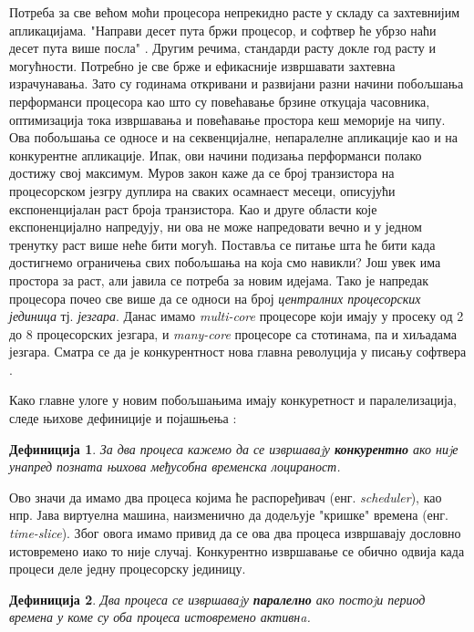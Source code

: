 \documentclass[12pt,oneside]{memoir}
\begin{document}
Потреба за све већом моћи процесора непрекидно расте у складу са захтевнијим апликацијама. "Направи десет пута бржи процесор, и софтвер ће убрзо наћи десет пута више посла" \cite{freeLunch}. Другим речима, стандарди расту докле год расту и могућности. Потребно је све брже и ефикасније извршавати захтевна израчунавања. Зато су годинама откривани и развијани разни начини побољшања перформанси процесора као што су повећавање брзине откуцаја часовника, оптимизација тока извршавања и повећавање простора кеш меморије на чипу. Ова побољшања се односе и на секвенцијалне, непаралелне апликације као и на конкурентне апликације. Ипак, ови начини подизања перформанси полако достижу свој максимум. Муров закон каже да се број транзистора на процесорском језгру дуплира на сваких осамнаест месеци, описујући експоненцијалан раст броја транзистора. Као и друге области које експоненцијално напредују, ни ова не може напредовати вечно и у једном тренутку раст више неће бити могућ. Поставља се питање шта ће бити када достигнемо ограничења свих побољшања на која смо навикли? Још увек има простора за раст, али јавила се потреба за новим идејама. Тако је напредак процесора почео све више да се односи на број \textit{централних процесорских јединица} тј. \textit{језгара}. Данас имамо \textit{multi-core} процесоре који имају у просеку од 2 до 8 процесорских језгара, и \textit{many-core} процесоре са стотинама, па и хиљадама језгара. Сматра се да је конкурентност нова главна револуција у писању софтвера \cite{freeLunch, survey}.

Како главне улоге у новим побољшањима имају конкуретност и паралелизација, следе њихове дефиниције и појашњења \cite{survey, konkMalkov, progInScala3}:  
\newtheorem{definition}{Дефиниција}
\begin{definition}
\textit{За два процеса кажемо да се извршаваjу \textbf{конкурентно} ако ниjе унапред позната њихова међусобна временска лоцираност.}
\end{definition}
Ово значи да имамо два процеса којима ће распоређивач (енг. \textit{scheduler}), као нпр. Јава виртуелна машина, наизменично да додељује "кришке" времена (енг. \textit{time-slice}). Због овога имамо привид да се ова два процеса извршавају дословно истовремено иако то није случај. Конкурентно извршавање се обично одвија када процеси деле једну процесорску јединицу.
\begin{definition}
\textit{Два процеса се извршаваjу \textbf{паралелно} ако постоjи период времена у коме су оба процеса истовремено активнa.}
\end{definition}
\end{document}
